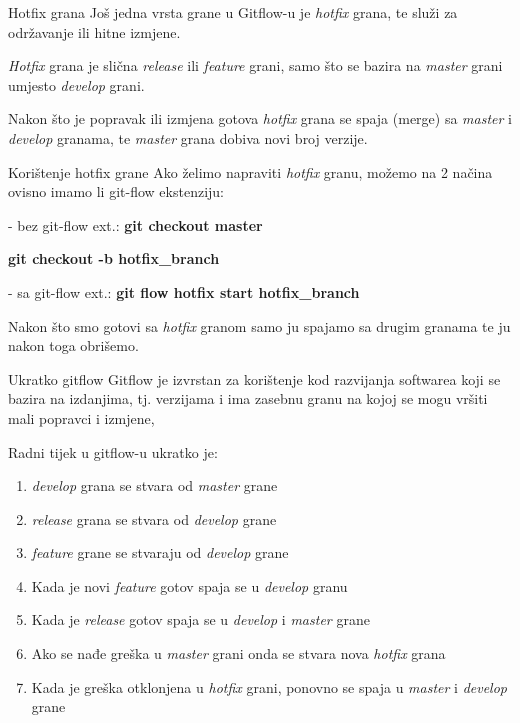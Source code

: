 \documentclass[10pt]{beamer}
\begin{document}
\begin{frame}{Hotfix grana}
Još jedna vrsta grane u Gitflow-u je \textit{hotfix} grana, te služi za održavanje ili hitne izmjene.

\textit{Hotfix} grana je slična \textit{release} ili \textit{feature} grani, samo što se bazira na \textit{master} grani umjesto \textit{develop} grani.

Nakon što je popravak ili izmjena gotova \textit{hotfix} grana se spaja (merge) sa \textit{master} i \textit{develop} granama, te \textit{master} grana dobiva novi broj verzije.
{
\setlength{\fboxsep}{1pt}
\setlength{\fboxrule}{1pt}
}
\end{frame}
\begin{frame}{Korištenje hotfix grane}
Ako želimo napraviti \textit{hotfix} granu, možemo na 2 načina ovisno imamo li git-flow ekstenziju:

- bez git-flow ext.: \textbf{git checkout master}

\textbf{git checkout -b hotfix\_branch}
                         
- sa git-flow ext.:  \textbf{git flow hotfix start hotfix\_branch}

Nakon što smo gotovi sa \textit{hotfix} granom samo ju spajamo sa drugim granama te ju nakon toga obrišemo.
\end{frame}
\begin{frame}{Ukratko gitflow}
Gitflow je izvrstan za korištenje kod razvijanja softwarea koji se bazira na izdanjima, tj. verzijama i ima zasebnu granu na kojoj se mogu vršiti mali popravci i izmjene,

Radni tijek u gitflow-u ukratko je:
\begin{enumerate}
    \item \textit{develop} grana se stvara od \textit{master} grane
    \item \textit{release} grana se stvara od \textit{develop} grane
    \item \textit{feature} grane se stvaraju od \textit{develop} grane
    \item Kada je novi \textit{feature} gotov spaja se u \textit{develop} granu
    \item Kada je \textit{release} gotov spaja se u \textit{develop} i \textit{master} grane
    \item Ako se nađe greška u \textit{master} grani onda se stvara nova \textit{hotfix} grana
    \item Kada je greška otklonjena u \textit{hotfix} grani, ponovno se spaja u \textit{master} i \textit{develop} grane
\end{enumerate}
\end{frame}
\end{document}
